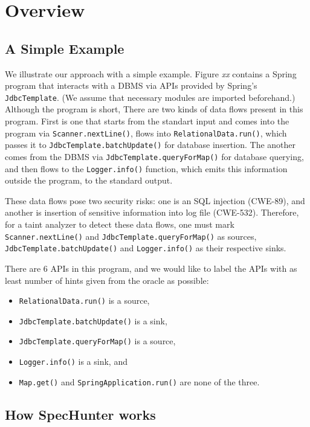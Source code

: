 \section{Overview}


\subsection{A Simple Example}



We illustrate our approach with a simple example. Figure \emph{xx} contains a
Spring program that interacts with a DBMS via APIs provided by Spring's
\texttt{JdbcTemplate}. (We assume that necessary modules are imported
beforehand.) Although the program is short, There are two kinds of
data flows present in this program. First is one that starts from
the standart input and comes into the program via \texttt{Scanner.nextLine()},
flows into \texttt{RelationalData.run()}, which passes it to
\texttt{JdbcTemplate.batchUpdate()} for database insertion. The another comes from
the DBMS via \texttt{JdbcTemplate.queryForMap()} for database querying, and then
flows to the \texttt{Logger.info()} function, which emits this information
outside the program, to the standard output.

These data flows pose two security risks: one is an SQL injection (CWE-89),
and another is insertion of sensitive information into log file (CWE-532).
Therefore, for a taint analyzer to detect these data flows, one must mark
\texttt{Scanner.nextLine()} and \texttt{JdbcTemplate.queryForMap()} as sources,
\texttt{JdbcTemplate.batchUpdate()} and \texttt{Logger.info()} as their respective
sinks.

There are 6 APIs in this program, and we would like to label the APIs with 
as least number of hints given from the oracle as possible:

\begin{itemize}
\item \texttt{RelationalData.run()} is a source,
\item \texttt{JdbcTemplate.batchUpdate()} is a sink,
\item \texttt{JdbcTemplate.queryForMap()} is a source,
\item \texttt{Logger.info()} is a sink, and
\item \texttt{Map.get()} and \texttt{SpringApplication.run()} are none of the three.
\end{itemize}

\subsection{How SpecHunter works}

